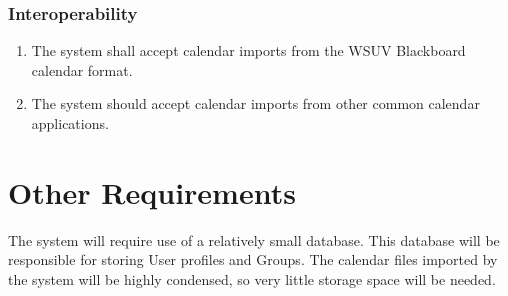 \documentclass{scrreprt}
\begin{document}
\subsection{Interoperability}
\begin{enumerate}
\item The system shall accept calendar imports from the WSUV Blackboard calendar
format.
\item The system should accept calendar imports from other common calendar
applications.
\end{enumerate}

\chapter{Other Requirements}
The system will require use of a relatively small database. This database will be responsible for storing User profiles and Groups. The calendar files imported by the system will be highly condensed, so very little storage space will be needed.
\end{document}
